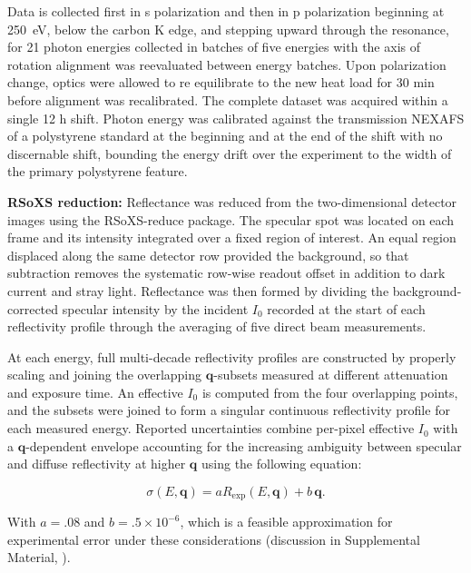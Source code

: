 Data is collected first in s polarization and then in p polarization beginning at \qty{250}{eV}, below the carbon K edge, and stepping upward through the resonance, for 21 photon energies collected in batches of five energies with the axis of rotation alignment was reevaluated between energy batches. Upon polarization change, optics were allowed to re equilibrate to the new heat load for 30 min before alignment was recalibrated. The complete dataset was acquired within a single 12 h shift. Photon energy was calibrated against the transmission NEXAFS of a polystyrene standard at the beginning and at the end of the shift with no discernable shift, bounding the energy drift over the experiment to the width of the primary polystyrene feature.

\textbf{RSoXS reduction:} Reflectance was reduced from the two-dimensional detector images using the RSoXS-reduce package.\autocite{ALSRSOXSPxrreduce2026} The specular spot was located on each frame and its intensity integrated over a fixed region of interest. An equal region displaced along the same detector row provided the background, so that subtraction removes the systematic row-wise readout offset in addition to dark current and stray light. Reflectance was then formed by dividing the background-corrected specular intensity by the incident \(I_{0}\) recorded at the start of each reflectivity profile through the averaging of five direct beam measurements.

At each energy, full multi-decade reflectivity profiles are constructed by properly scaling and joining the overlapping \(\mathbf{q}\)-subsets measured at different attenuation and exposure time. An effective \(I_{0}\) is computed from the four overlapping points, and the subsets were joined to form a singular continuous reflectivity profile for each measured energy. Reported uncertainties combine per-pixel effective \(I_{0}\) with a \(\mathbf{q}\)-dependent envelope accounting for the increasing ambiguity between specular and diffuse reflectivity at higher \(\mathbf{q}\) using the following equation:

\begin{equation}
  \sigma(E,\mathbf{q}) = a R_{\mathrm{exp}}(E,\mathbf{q}) + b\,\mathbf{q}.
  \label{eq:uncertainty-envelope}
\end{equation}

With \(a = .08\) and \(b = .5 \times 10^{- 6}\), which is a feasible approximation for experimental error under these considerations (discussion in Supplemental Material, ).

